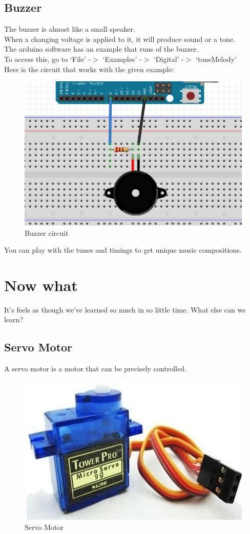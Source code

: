 \documentclass[14pt, oneside]{memoir}
\begin{document}
\section*{Buzzer}
The buzzer is almost like a small speaker.
\\
When a changing voltage is applied to it, it will produce sound or
a tone.
\\
The arduino software has an example that runs of the buzzer.
\\
To access this, go to `File' -$>$ `Examples' -$>$ `Digital' -$>$
`toneMelody'
\\
Here is the circuit that works with the given example:
\begin{figure}[H]
    \includegraphics[width=0.7\linewidth]{circuit_images/buzzer.png}
    \caption{Buzzer circuit}
\end{figure}

You can play with the tunes and timings to get unique music
compositions.

\chapter{Now what}
It's feels as though we've learned so much in so little time. What
else can we learn?

\section*{Servo Motor}
A servo motor is a motor that can be precisely controlled.\\
\begin{figure}[h]
    \includegraphics[width=0.5\linewidth]{./circuit_images/servo_motor.jpg}
    \caption{Servo Motor}
\end{figure}
\end{document}
